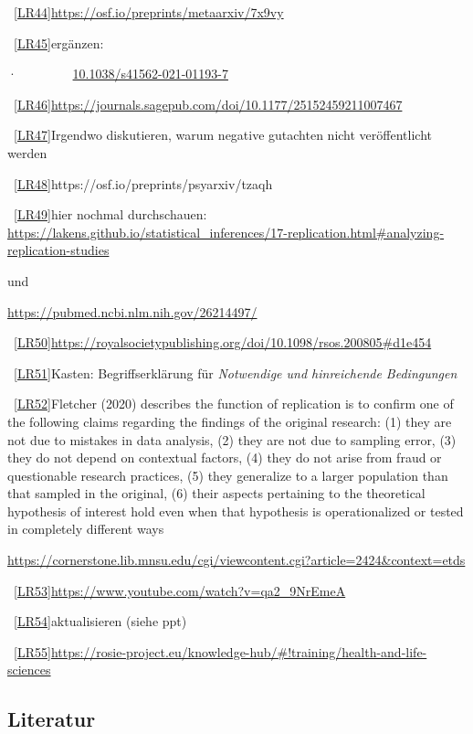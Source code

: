 \documentclass[
  letterpaper,
  DIV=11,
  numbers=noendperiod]{scrreprt}
\begin{document}
~\hyperref[_msoanchor_44]{{[}LR44{]}}\url{https://osf.io/preprints/metaarxiv/7x9vy}

~\hyperref[_msoanchor_45]{{[}LR45{]}}ergänzen:

·~~~~~~~~
\href{https://doi.org/10.1038/s41562-021-01193-7}{10.1038/s41562-021-01193-7}

~\hyperref[_msoanchor_46]{{[}LR46{]}}\url{https://journals.sagepub.com/doi/10.1177/25152459211007467}

~\hyperref[_msoanchor_47]{{[}LR47{]}}Irgendwo diskutieren, warum
negative gutachten nicht veröffentlicht werden

~\hyperref[_msoanchor_48]{{[}LR48{]}}https://osf.io/preprints/psyarxiv/tzaqh

~\hyperref[_msoanchor_49]{{[}LR49{]}}hier nochmal durchschauen:
\url{https://lakens.github.io/statistical_inferences/17-replication.html\#analyzing-replication-studies}~

und

\url{https://pubmed.ncbi.nlm.nih.gov/26214497/}

~\hyperref[_msoanchor_50]{{[}LR50{]}}\url{https://royalsocietypublishing.org/doi/10.1098/rsos.200805\#d1e454}

~\hyperref[_msoanchor_51]{{[}LR51{]}}Kasten: Begriffserklärung für
\emph{Notwendige und hinreichende Bedingungen}

~\hyperref[_msoanchor_52]{{[}LR52{]}}Fletcher (2020) describes the
function of replication is to confirm one of the following claims
regarding the findings of the original research: (1) they are not due to
mistakes in data analysis, (2) they are not due to sampling error, (3)
they do not depend on contextual factors, (4) they do not arise from
fraud or questionable research practices, (5) they generalize to a
larger population than that sampled in the original, (6) their aspects
pertaining to the theoretical hypothesis of interest hold even when that
hypothesis is operationalized or tested in completely different ways

\url{https://cornerstone.lib.mnsu.edu/cgi/viewcontent.cgi?article=2424&context=etds}

~\hyperref[_msoanchor_53]{{[}LR53{]}}\url{https://www.youtube.com/watch?v=qa2_9NrEmeA}

~\hyperref[_msoanchor_54]{{[}LR54{]}}aktualisieren (siehe ppt)

~\hyperref[_msoanchor_55]{{[}LR55{]}}\url{https://rosie-project.eu/knowledge-hub/\#!training/health-and-life-sciences}

\subsection{Literatur}\label{literatur-11}
\end{document}
